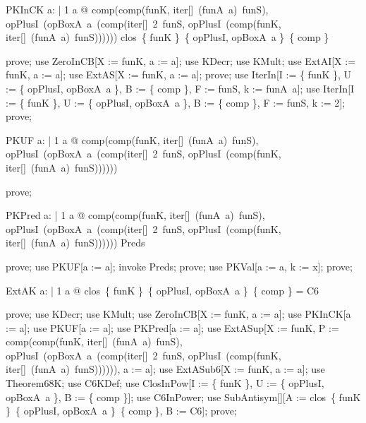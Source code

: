\documentclass{article}
\begin{document}
\begin{theorem}{PKInCK}
  \forall a: \nat | 1 \leq a @ comp(comp(funK, iter[\nat]~(funA~a)~funS), opPlusI~(opBoxA~a~(comp(iter[\nat]~2~funS, opPlusI~(comp(funK, iter[\nat]~(funA~a)~funS)))))) \in clos~\{ funK \}~\{ opPlusI, opBoxA~a \}~\{ comp \}
\end{theorem}

\begin{zproof}
prove;
use ZeroInCB[X := funK, a := a];
use KDecr;
use KMult;
use ExtAI[X := funK, a := a];
use ExtAS[X := funK, a := a];
prove;
use IterIn[I := \{ funK \}, U := \{ opPlusI, opBoxA~a \}, B := \{ comp \}, F := funS, k := funA~a];
use IterIn[I := \{ funK \}, U := \{ opPlusI, opBoxA~a \}, B := \{ comp \}, F := funS, k := 2];
prove;
\end{zproof}

\begin{theorem}{PKUF}
  \forall a: \nat | 1 \leq a @ comp(comp(funK, iter[\nat]~(funA~a)~funS), opPlusI~(opBoxA~a~(comp(iter[\nat]~2~funS, opPlusI~(comp(funK, iter[\nat]~(funA~a)~funS)))))) \in \nat \fun \nat
\end{theorem}

\begin{zproof}
prove;
\end{zproof}

\begin{theorem}{PKPred}
  \forall a: \nat | 1 \leq a @ comp(comp(funK, iter[\nat]~(funA~a)~funS), opPlusI~(opBoxA~a~(comp(iter[\nat]~2~funS, opPlusI~(comp(funK, iter[\nat]~(funA~a)~funS)))))) \in Preds
\end{theorem}

\begin{zproof}
prove;
use PKUF[a := a];
invoke Preds;
prove;
use PKVal[a := a, k := x];
prove;
\end{zproof}

\begin{theorem}{ExtAK}
  \forall a: \nat | 1 \leq a @ clos~\{ funK \}~\{ opPlusI, opBoxA~a \}~\{ comp \} = C6
\end{theorem}

\begin{zproof}
prove;
use KDecr;
use KMult;
use ZeroInCB[X := funK, a := a];
use PKInCK[a := a];
use PKUF[a := a];
use PKPred[a := a];
use ExtASup[X := funK, P := comp(comp(funK, iter[\nat]~(funA~a)~funS), opPlusI~(opBoxA~a~(comp(iter[\nat]~2~funS, opPlusI~(comp(funK, iter[\nat]~(funA~a)~funS)))))), a := a];
use ExtASub6[X := funK, a := a];
use Theorem68K;
use C6KDef;
use ClosInPow[I := \{ funK \}, U := \{ opPlusI, opBoxA~a \}, B := \{ comp \}];
use C6InPower;
use SubAntisym[\nat \fun \nat][A := clos~\{ funK \}~\{ opPlusI, opBoxA~a \}~\{ comp \}, B := C6];
prove;
\end{zproof}
\end{document}
